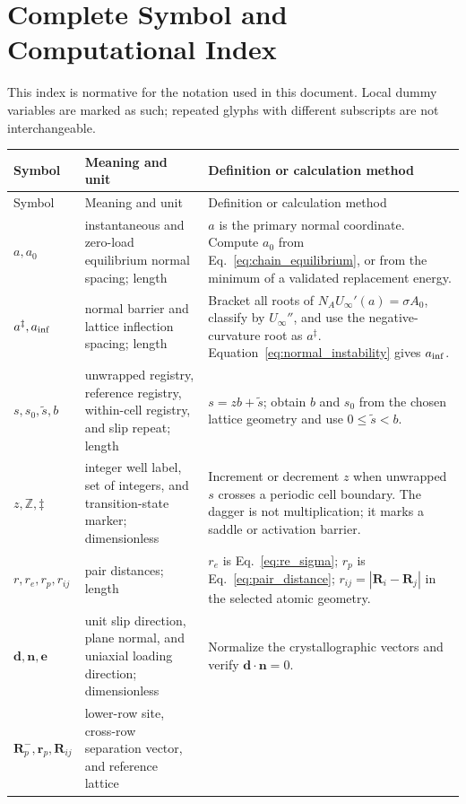 \section{Complete Symbol and Computational Index}

This index is normative for the notation used in this document. Local dummy variables are marked as
such; repeated glyphs with different subscripts are not interchangeable.

\small
\begin{longtable}{>{\raggedright\arraybackslash}p{}
                  >{\raggedright\arraybackslash}p{}
                  >{\raggedright\arraybackslash}p{}}
\toprule
Symbol & Meaning and unit & Definition or calculation method\\
\midrule
\endfirsthead
\toprule
Symbol & Meaning and unit & Definition or calculation method\\
\midrule
\endhead
\bottomrule
\endfoot
$a,a_0$ & instantaneous and zero-load equilibrium normal spacing; length & $a$ is the primary
normal coordinate. Compute $a_0$ from Eq.~\eqref{eq:chain_equilibrium}, or from the minimum of a
validated replacement energy.\\
$a^\ddagger,a_{\rm inf}$ & normal barrier and lattice inflection spacing; length & Bracket all roots
of $N_AU_\infty'(a)=\sigma A_0$, classify by $U_\infty''$, and use the negative-curvature root as
$a^\ddagger$. Equation~\eqref{eq:normal_instability} gives $a_{\rm inf}$.\\
$s,s_0,\widetilde s,b$ & unwrapped registry, reference registry, within-cell registry, and slip
repeat; length & $s=zb+\widetilde s$; obtain $b$ and $s_0$ from the chosen lattice geometry and use
$0\leq\widetilde s<b$.\\
$z,\mathbb Z,\ddagger$ & integer well label, set of integers, and transition-state marker;
dimensionless & Increment or decrement $z$ when unwrapped $s$ crosses a periodic cell boundary.
The dagger is not multiplication; it marks a saddle or activation barrier.\\
$r,r_e,r_p,r_{ij}$ & pair distances; length & $r_e$ is Eq.~\eqref{eq:re_sigma}; $r_p$ is
Eq.~\eqref{eq:pair_distance}; $r_{ij}=|\bm R_i-\bm R_j|$ in the selected atomic geometry.\\
$\bm d,\bm n,\bm e$ & unit slip direction, plane normal, and uniaxial loading direction;
dimensionless & Normalize the crystallographic vectors and verify
$\bm d\mathbin{\cdot}\bm n=0$.\\
$\bm R_p^-,\bm r_p,\bm R_{ij}$ & lower-row site, cross-row separation vector, and reference lattice

\end{longtable}
